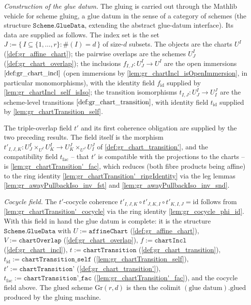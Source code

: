 \begin{definition}
  \emph{Construction of the glue datum.} The gluing is carried out through the
  Mathlib vehicle for scheme gluing, a glue datum in the sense of a category of
  schemes (the structure \(\mathtt{Scheme.GlueData}\), extending the abstract
  glue-datum interface). Its data are supplied as follows. The index set is the
  set \(J := \{\, I \subseteq \{1,\dots,r\} : \#(I) = d \,\}\) of size-\(d\)
  subsets. The objects are the charts \(U^I\) (\cref{def:gr_affine_chart}); the
  pairwise overlaps are the schemes \(U^I_J\) (\cref{def:gr_chart_overlap}); the
  inclusions \(f_{I,J} : U^I_J \to U^I\) are the open immersions
  \(\cref{def:gr_chart_incl}\) (open immersions by
  \cref{lem:gr_chartIncl_isOpenImmersion}, in particular monomorphisms), with the
  identity field \(f_{\mathrm{id}}\) supplied by
  \cref{lem:gr_chartIncl_self_isIso}; the transition isomorphisms
  \(t_{I,J} : U^I_J \to U^J_I\) are the scheme-level transitions
  \(\cref{def:gr_chart_transition}\), with identity field \(t_{\mathrm{id}}\)
  supplied by \cref{lem:gr_chartTransition_self}.

  The triple-overlap field \(t'\) and its first coherence obligation are supplied
  by the two preceding results. The field itself is the morphism
  \(t'_{I,J,K} : U^I_J \times_{U^I} U^I_K \to U^J_K \times_{U^J} U^J_I\) of
  \cref{def:gr_chart_transition'}, and the compatibility field
  \(t_{\mathrm{fac}}\) -- that \(t'\) is compatible with the projections to the
  charts -- is \cref{lem:gr_chartTransition'_fac}, which reduces (both fibre
  products being affine) to the ring identity
  \cref{lem:gr_chartTransition'_ringIdentity} via the leg lemmas
  \cref{lem:gr_awayPullbackIso_inv_fst} and \cref{lem:gr_awayPullbackIso_inv_snd}.

  \emph{Cocycle field.} The \(t'\)-cocycle coherence
  \(t'_{I,J,K} \circ t'_{J,K,I} \circ t'_{K,I,J} = \mathrm{id}\)
  follows from \cref{lem:gr_chartTransition'_cocycle} via the ring identity
  \cref{lem:gr_cocycle_phi_id}. With this field in hand the glue datum is
  complete: it is the structure \(\mathtt{Scheme.GlueData}\) with
  \(U := \texttt{affineChart}\) (\cref{def:gr_affine_chart}),
  \(V := \texttt{chartOverlap}\) (\cref{def:gr_chart_overlap}),
  \(f := \texttt{chartIncl}\) (\cref{def:gr_chart_incl}),
  \(t := \texttt{chartTransition}\) (\cref{def:gr_chart_transition}),
  \(t_{\mathrm{id}} := \texttt{chartTransition\_self}\)
  (\cref{lem:gr_chartTransition_self}),
  \(t' := \texttt{chartTransition'}\) (\cref{def:gr_chart_transition'}),
  \(t_{\mathrm{fac}} := \texttt{chartTransition'\_fac}\)
  (\cref{lem:gr_chartTransition'_fac}), and the cocycle field above. The glued
  scheme \(\mathrm{Gr}(r,d)\) is then the colimit
  \((\text{glue datum}).\mathrm{glued}\) produced by the gluing machine.


\end{definition}
